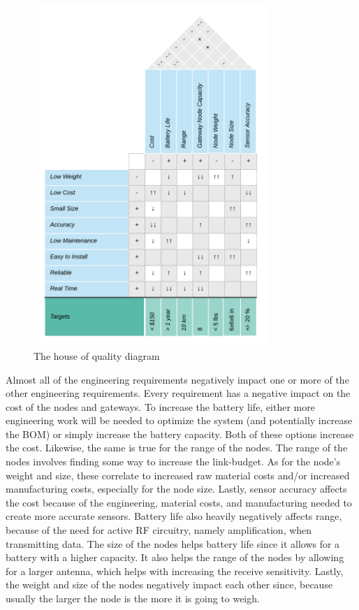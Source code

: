 \begin{figure}[H]
    \centering
    \includegraphics[width=3.5in]{./figures/hoq.png} 
    \caption{The house of quality diagram}
    \label{fig:hoq}
\end{figure}

Almost all of the engineering requirements negatively impact one or more of the
other engineering requirements. Every requirement has a negative impact on the
cost of the nodes and gateways. To increase the battery life, either more
engineering work will be needed to optimize the system (and potentially increase
the BOM) or simply increase the battery capacity. Both of these options increase
the cost.  Likewise, the same is true for the range of the nodes. The range of
the nodes involves finding some way to increase the link-budget. As for the
node's weight and size, these correlate to increased raw material costs and/or
increased manufacturing costs, especially for the node size. Lastly, sensor
accuracy affects the cost because of the engineering, material costs, and
manufacturing needed to create more accurate sensors. Battery life also heavily
negatively affects range, because of the need for active RF circuitry,
namely amplification, when transmitting data. The size of the nodes helps battery
life since it allows for a battery with a higher capacity. It also helps the
range of the nodes by allowing for a larger antenna, which helps with increasing
the receive sensitivity. Lastly, the weight and size of the nodes negatively
impact each other since, because usually the larger the node is the more it is
going to weigh.

